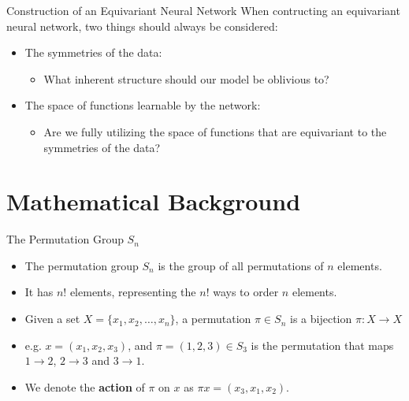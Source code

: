 \documentclass{beamer}
\begin{document}
\begin{frame}{Construction of an Equivariant Neural Network}
    When contructing an equivariant neural network, two things should always be considered:
    \begin{itemize} 
        \setlength{\itemsep}{\fill}
        \item The symmetries of the data:
        \begin{itemize}
            \item What inherent structure should our model be oblivious to?
        \end{itemize}
        \item The space of functions learnable by the network:\\ 
        \begin{itemize}
            \item Are we fully utilizing the space of functions that are equivariant to the symmetries of the data?
        \end{itemize}
    \end{itemize}
    
\end{frame}

\section{Mathematical Background}




\begin{frame}{The Permutation Group $S_n$}

    \begin{itemize}
        \setlength{\itemsep}{\fill}
        \item The permutation group $S_n$ is the group of all permutations of $n$ elements.
        \item It has $n!$ elements, representing the $n!$ ways to order $n$ elements.
        \item Given a set $X = \{x_1, x_2, \ldots, x_n\}$, a permutation $\pi \in S_n$ is a bijection $\pi: X \rightarrow X$
        \item e.g. $x = (x_1, x_2, x_3)$, and $\pi = (1, 2, 3) \in S_3$ is the permutation that maps $1 \rightarrow 2$, $2 \rightarrow 3$ and $3 \rightarrow 1$.
        \item We denote the \textbf{action} of $\pi$ on $x$ as $\pi x = (x_3, x_1, x_2)$. 
    \end{itemize}

    
\end{frame}
\end{document}
